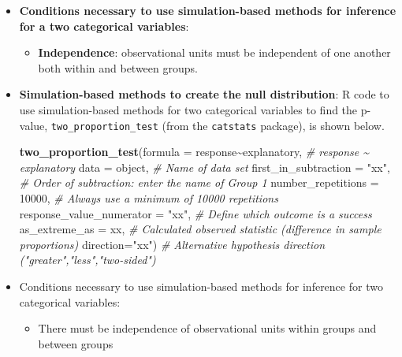 \documentclass[
]{report}
\newenvironment{Shaded}{\begin{snugshade}}{\end{snugshade}}
\newcommand{\AttributeTok}[1]{\textcolor[rgb]{0.13,0.29,0.53}{#1}}
\newcommand{\CommentTok}[1]{\textcolor[rgb]{0.56,0.35,0.01}{\textit{#1}}}
\newcommand{\DecValTok}[1]{\textcolor[rgb]{0.00,0.00,0.81}{#1}}
\newcommand{\FunctionTok}[1]{\textcolor[rgb]{0.13,0.29,0.53}{\textbf{#1}}}
\newcommand{\NormalTok}[1]{#1}
\newcommand{\SpecialCharTok}[1]{\textcolor[rgb]{0.81,0.36,0.00}{\textbf{#1}}}
\newcommand{\StringTok}[1]{\textcolor[rgb]{0.31,0.60,0.02}{#1}}
\providecommand{\tightlist}{%
  \setlength{\itemsep}{0pt}\setlength{\parskip}{0pt}}
\begin{document}
\begin{itemize}
\item
  \textbf{Conditions necessary to use simulation-based methods for inference for a two categorical variables}:

  \begin{itemize}
  \tightlist
  \item
    \textbf{Independence}: observational units must be independent of one another both within and between groups.
  \end{itemize}
\item
  \textbf{Simulation-based methods to create the null distribution}: R code to use simulation-based methods for two categorical variables to find the p-value, \texttt{two\_proportion\_test} (from the \texttt{catstats} package), is shown below.

\begin{Shaded}
\begin{Highlighting}[]
\FunctionTok{two\_proportion\_test}\NormalTok{(}\AttributeTok{formula =}\NormalTok{ response}\SpecialCharTok{\textasciitilde{}}\NormalTok{explanatory, }\CommentTok{\# response \textasciitilde{} explanatory}
    \AttributeTok{data =}\NormalTok{ object, }\CommentTok{\# Name of data set}
    \AttributeTok{first\_in\_subtraction =} \StringTok{"xx"}\NormalTok{, }\CommentTok{\# Order of subtraction: enter the name of Group 1}
    \AttributeTok{number\_repetitions =} \DecValTok{10000}\NormalTok{, }\CommentTok{\# Always use a minimum of 10000 repetitions}
    \AttributeTok{response\_value\_numerator =} \StringTok{"xx"}\NormalTok{, }\CommentTok{\# Define which outcome is a success}
    \AttributeTok{as\_extreme\_as =}\NormalTok{ xx, }\CommentTok{\# Calculated observed statistic (difference in sample proportions)}
    \AttributeTok{direction=}\StringTok{"xx"}\NormalTok{) }\CommentTok{\# Alternative hypothesis direction ("greater","less","two{-}sided")}
\end{Highlighting}
\end{Shaded}
\item
  Conditions necessary to use simulation-based methods for inference for two categorical variables:

  \begin{itemize}
  \tightlist
  \item
    There must be independence of observational units within groups and between groups
  \end{itemize}
\end{itemize}
\end{document}
